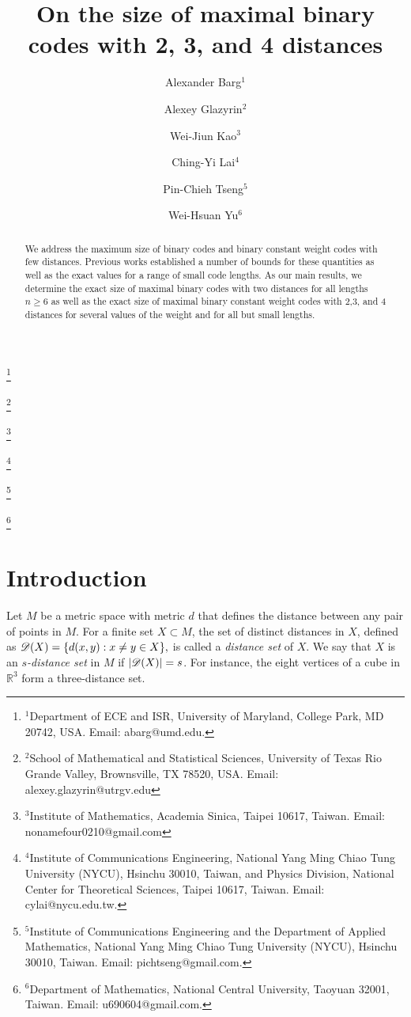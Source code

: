 \documentclass{amsart}
\begin{document}
\title[]{On the size of maximal binary codes with 2, 3, and 4 distances}

\author[]{Alexander Barg$^1$}\thanks{$^1$Department of ECE and ISR, University of Maryland, College Park, MD 20742, USA. Email: abarg@umd.edu.}
\author[]{Alexey Glazyrin$^2$}\thanks{$^2$School of Mathematical and Statistical Sciences, University of Texas Rio Grande Valley, Brownsville, TX 78520, USA. Email: alexey.glazyrin@utrgv.edu}
\author[]{Wei-Jiun Kao$^3$}\thanks{$^3$Institute of Mathematics, Academia Sinica, Taipei 10617, Taiwan. Email: nonamefour0210@gmail.com}
\author[]{Ching-Yi Lai$^4$}\thanks{$^4$Institute of Communications Engineering, National Yang Ming Chiao Tung University (NYCU), Hsinchu 30010, Taiwan, and Physics Division, National Center for Theoretical Sciences, Taipei 10617, Taiwan.
Email: cylai@nycu.edu.tw.} 
\author[]{Pin-Chieh Tseng$^5$}\thanks{$^5$Institute of Communications Engineering and the Department of Applied Mathematics, National Yang Ming Chiao Tung University (NYCU), Hsinchu 30010, Taiwan.
Email: pichtseng@gmail.com.}
\author[]{Wei-Hsuan Yu$^6$}
\thanks{$^6$Department of Mathematics, National Central University, Taoyuan 32001, Taiwan. Email: u690604@gmail.com.}



\begin{abstract}
We address the maximum size of binary codes and binary constant weight codes with few distances. Previous works established a number of bounds for these quantities as well as the exact values for a range of small code lengths. As our main results, we determine the exact size of maximal binary codes with two distances for all lengths $n\ge 6$ as well as the exact size of maximal binary constant weight codes with 2,3, and 4 distances for several values of the weight and for all but small lengths. 
\end{abstract}

\maketitle

\section{Introduction}
Let $M$ be a metric space with metric $d$ that defines the distance between any pair of points in $M$. 
For  a finite set $X \subset M$, the set of distinct distances in $X$, defined as $ \mathscr{D}(X)=\{ d(x, y) : x\neq  y \in X\},$
is called a \textit{distance set} of $X$.
We say that $X$ is an \textit{$s$-distance set} in $M$ if  $|\mathscr{D}(X)|=s$. 
For instance, the eight vertices of a cube in $\mathbb{R}^3$ form a three-distance set.
\end{document}
